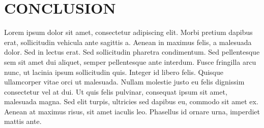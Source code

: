 
\section{CONCLUSION}
\label{sec:conclusion}
Lorem ipsum dolor sit amet, consectetur adipiscing elit. Morbi pretium dapibus erat, sollicitudin vehicula ante sagittis a. Aenean in maximus felis, a malesuada dolor. Sed in lectus erat. Sed sollicitudin pharetra condimentum. Sed pellentesque sem sit amet dui aliquet, semper pellentesque ante interdum. Fusce fringilla arcu nunc, ut lacinia ipsum sollicitudin quis. Integer id libero felis. Quisque ullamcorper vitae orci ut malesuada. Nullam molestie justo eu felis dignissim consectetur vel at dui. Ut quis felis pulvinar, consequat ipsum sit amet, malesuada magna. Sed elit turpis, ultricies sed dapibus eu, commodo sit amet ex. Aenean at maximus risus, sit amet iaculis leo. Phasellus id ornare urna, imperdiet mattis ante.